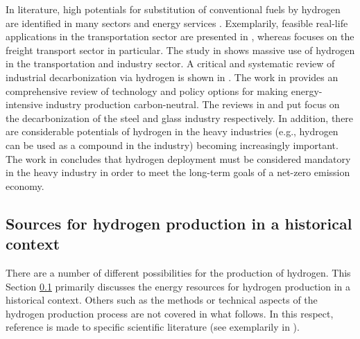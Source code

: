 \documentclass[review]{elsarticle}
\begin{document}
In literature, high potentials for substitution of conventional fuels by hydrogen are identified in many sectors \cite{burandt2019decarbonizing} and energy services \cite{mouli2021mapping}. Exemplarily, feasible real-life applications in the transportation sector are presented in \cite{zhang2016times}, whereas \cite{auer2020development} focuses on the freight transport sector in particular. The study in \cite{hainsch2022energy} shows massive use of hydrogen in the transportation and industry sector. A critical and systematic review of industrial decarbonization via hydrogen is shown in \cite{griffiths2021industrial}. The work in \cite{bataille2018review} provides an comprehensive review of technology and policy options for making energy-intensive industry production carbon-neutral. The reviews in \cite{wang2021hydrogen} and \cite{zier2021review} put focus on the decarbonization of the steel and glass industry respectively. In addition, there are considerable potentials of hydrogen in the heavy industries (e.g., hydrogen can be used as a compound in the industry) becoming increasingly important. The work in \cite{rissman2020technologies} concludes that hydrogen deployment must be considered mandatory in the heavy industry in order to meet the long-term goals of a net-zero emission economy. 


\subsection{Sources for hydrogen production in a historical context}\label{state2}
There are a number of different possibilities for the production of hydrogen. This Section \ref{state2} primarily discusses the energy resources for hydrogen production in a historical context. Others such as the methods or technical aspects of the hydrogen production process are not covered in what follows. In this respect, reference is made to specific scientific literature (see exemplarily in \cite{dincer2015review}).\vspace{0.3cm}
\end{document}
